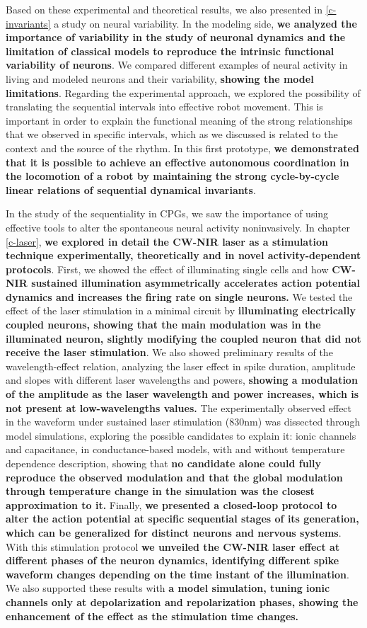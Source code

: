 Based on these experimental and theoretical results, we also presented in \ref{c-invariants} a study on neural variability. In the modeling side, \textbf{we analyzed the importance of variability in the study of neuronal dynamics and the limitation of classical models to reproduce the intrinsic functional variability of neurons}. We compared different examples of neural activity in living and modeled neurons and their variability, \textbf{ showing the model limitations}. Regarding the experimental approach, we explored the possibility of translating the sequential intervals into effective robot movement. This is important in order to explain the functional meaning of the strong relationships that we observed in specific intervals, which as we discussed is related to the context and the source of the rhythm. In this first prototype, \textbf{we demonstrated that it is possible to achieve an effective autonomous coordination in the locomotion of a robot by maintaining the strong cycle-by-cycle linear relations of sequential dynamical invariants}.

In the study of the sequentiality in CPGs, we saw the importance of using effective tools to alter the spontaneous neural activity noninvasively. In chapter \ref{c-laser}, \textbf{we explored in detail the CW-NIR laser as a stimulation technique experimentally, theoretically and in novel  activity-dependent protocols}. First, we showed the effect of illuminating single cells and how \textbf{CW-NIR sustained illumination asymmetrically accelerates action potential dynamics and increases the firing rate on single neurons.} We tested the effect of the laser stimulation in a minimal circuit by \textbf{illuminating electrically coupled neurons, showing that the main modulation was in the illuminated neuron, slightly modifying the coupled neuron that did not receive the laser stimulation}. We also showed preliminary results of the wavelength-effect relation, analyzing the laser effect in spike duration, amplitude and slopes with different laser wavelengths and powers, \textbf{showing a modulation of the amplitude as the laser wavelength and power increases, which is not present at low-wavelengths values.} The experimentally observed effect in the waveform under sustained laser stimulation (830nm) was dissected through model simulations, exploring the possible candidates to explain it: ionic channels and capacitance, in conductance-based models, with and without temperature dependence description, showing that \textbf{no candidate alone could fully reproduce the observed modulation and that the global modulation through temperature change in the simulation was the closest approximation to it.} Finally, \textbf{we presented a closed-loop protocol to alter the action potential at specific sequential stages of its generation, which can be generalized for distinct neurons and nervous systems}. With this stimulation protocol \textbf{we unveiled the CW-NIR laser effect at different phases of the neuron dynamics,  identifying different spike waveform changes depending on the time instant of the illumination}. We also supported these results with \textbf{a model simulation, tuning ionic channels only at depolarization and repolarization phases, showing the enhancement of the effect as the stimulation time changes.}

